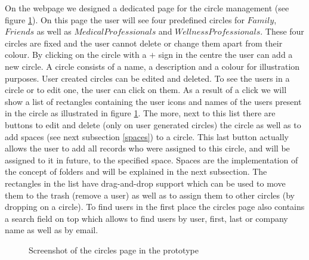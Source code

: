 On the webpage we designed a dedicated page for the circle management (see figure \ref{fig:circlesScreenshot}). On this page the user will see four predefined circles for $Family$, $Friends$ as well as $Medical Professionals$ and $Wellness Professionals$. These four circles are fixed and the user cannot delete or change them apart from their colour. By clicking on the circle with a $+$ sign in the centre the user can add a new circle. A circle consists of a name, a description and a colour for illustration purposes. User created circles can be edited and deleted. To see the users in a circle or to edit one, the user can click on them. As a result of a click we will show a list of rectangles containing the user icons and names of the users present in the circle as illustrated in figure \ref{fig:circlesScreenshot}.  The more, next to this list there are buttons to edit and delete (only on user generated circles) the circle as well as to add spaces (see next subsection \ref{spaces}) to a circle. This last button actually allows the user to add all records who were assigned to this circle, and will be assigned to it in future, to the specified space. Spaces are the implementation of the concept of folders and will be explained in the next subsection. The rectangles in the list have drag-and-drop support which can be used to move them to the trash (remove a user) as well as to assign them to other circles (by dropping on a circle). To find users in the first place the circles page also contains a search field on top which allows to find users by user, first, last or company name as well as by email. 

\begin{figure}[h]
%
\caption{Screenshot of the circles page in the prototype}
\label{fig:circlesScreenshot}
\end{figure} 



